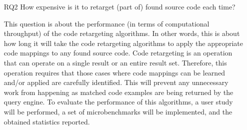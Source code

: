\begin{itemize}
	\item[RQ2] How expensive is it to retarget (part of) found source code each time?
	
	This question is about the performance (in terms of computational throughput) of the code 
	retargeting algorithms. In other words, this is about how long it will take the code retargeting 
	algorithms to apply the appropriate code mappings to any found source code. Code retargeting is 
	an operation that can operate on a single result or an entire result set. Therefore, this 
	operation requires that those cases where code mappings can be learned and/or applied are 
	carefully identified. This will prevent any unnecessary work from happening as matched code 
	examples are being returned by the query engine. To evaluate the performance of this algorithms, 
	a user study will be performed, a set of microbenchmarks will be implemented, and the obtained statistics 
	reported.
	
	

\end{itemize}
